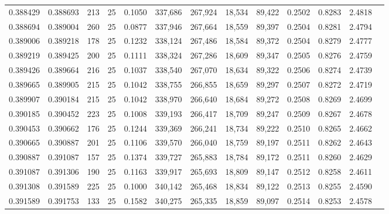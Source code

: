 \begin{tabular}{rrrrrrrrrrrrr}
0.388429 & 0.388693 &   213 &  25 &                                     0.1050 & 337,686 & 267,924 &  18,534 &  89,422 & 0.2502 & 0.8283 & 2.4818 \\
0.388694 & 0.389004 &   260 &  25 &                                     0.0877 & 337,946 & 267,664 &  18,559 &  89,397 & 0.2504 & 0.8281 & 2.4794 \\
0.389006 & 0.389218 &   178 &  25 &                                     0.1232 & 338,124 & 267,486 &  18,584 &  89,372 & 0.2504 & 0.8279 & 2.4777 \\
0.389219 & 0.389425 &   200 &  25 &                                     0.1111 & 338,324 & 267,286 &  18,609 &  89,347 & 0.2505 & 0.8276 & 2.4759 \\
0.389426 & 0.389664 &   216 &  25 &                                     0.1037 & 338,540 & 267,070 &  18,634 &  89,322 & 0.2506 & 0.8274 & 2.4739 \\
0.389665 & 0.389905 &   215 &  25 &                                     0.1042 & 338,755 & 266,855 &  18,659 &  89,297 & 0.2507 & 0.8272 & 2.4719 \\
0.389907 & 0.390184 &   215 &  25 &                                     0.1042 & 338,970 & 266,640 &  18,684 &  89,272 & 0.2508 & 0.8269 & 2.4699 \\
0.390185 & 0.390452 &   223 &  25 &                                     0.1008 & 339,193 & 266,417 &  18,709 &  89,247 & 0.2509 & 0.8267 & 2.4678 \\
0.390453 & 0.390662 &   176 &  25 &                                     0.1244 & 339,369 & 266,241 &  18,734 &  89,222 & 0.2510 & 0.8265 & 2.4662 \\
0.390665 & 0.390887 &   201 &  25 &                                     0.1106 & 339,570 & 266,040 &  18,759 &  89,197 & 0.2511 & 0.8262 & 2.4643 \\
0.390887 & 0.391087 &   157 &  25 &                                     0.1374 & 339,727 & 265,883 &  18,784 &  89,172 & 0.2511 & 0.8260 & 2.4629 \\
0.391087 & 0.391306 &   190 &  25 &                                     0.1163 & 339,917 & 265,693 &  18,809 &  89,147 & 0.2512 & 0.8258 & 2.4611 \\
0.391308 & 0.391589 &   225 &  25 &                                     0.1000 & 340,142 & 265,468 &  18,834 &  89,122 & 0.2513 & 0.8255 & 2.4590 \\
0.391589 & 0.391753 &   133 &  25 &                                     0.1582 & 340,275 & 265,335 &  18,859 &  89,097 & 0.2514 & 0.8253 & 2.4578 \\

\end{tabular}
